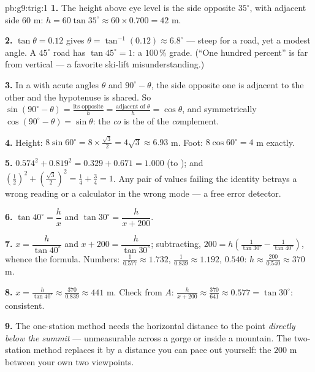\begin{solution}{pb:g9:trig:1}
\textbf{1.} The height above eye level is the side opposite
$35^\circ$, with adjacent side $60$ m:
$h = 60 \tan 35^\circ \approx 60 \times 0.700 = 42$ m.

\textbf{2.} $\tan\theta = 0.12$ gives
$\theta = \tan^{-1}(0.12) \approx 6.8^\circ$ --- steep for a
road, yet a modest angle. A $45^\circ$ road has
$\tan 45^\circ = 1$: a $100\,\%$ grade. (``One hundred
percent'' is far from vertical --- a favorite ski-lift
misunderstanding.)

\textbf{3.} In a  with acute angles $\theta$ and
$90^\circ - \theta$, the side opposite one is adjacent to the
other and the hypotenuse is shared. So
$\sin(90^\circ - \theta) = \frac{\text{its opposite}}{h} =
\frac{\text{adjacent of }\theta}{h} = \cos\theta$, and
symmetrically $\cos(90^\circ - \theta) = \sin\theta$: the
\emph{co} is the  of the \emph{co}mplement.

\textbf{4.} Height: $8 \sin 60^\circ = 8 \times
\frac{\sqrt3}{2} = 4\sqrt3 \approx 6.93$ m. Foot:
$8 \cos 60^\circ = 4$ m exactly.

\textbf{5.} $0.574^2 + 0.819^2 = 0.329 + 0.671 = 1.000$ (to
); and $\left(\frac12\right)^2 +
\left(\frac{\sqrt3}{2}\right)^2 = \frac14 + \frac34 = 1$. Any
pair of values failing the identity betrays a wrong reading or
a calculator in the wrong mode --- a free error detector.

\textbf{6.} $\tan 40^\circ = \dfrac hx$ and
$\tan 30^\circ = \dfrac{h}{x + 200}$.

\textbf{7.} $x = \dfrac{h}{\tan 40^\circ}$ and
$x + 200 = \dfrac{h}{\tan 30^\circ}$; subtracting,
$200 = h\left(\frac{1}{\tan 30^\circ} -
\frac{1}{\tan 40^\circ}\right)$, whence the formula. Numbers:
$\frac{1}{0.577} \approx 1.732$, $\frac{1}{0.839} \approx
1.192$,  $0.540$:
$h \approx \frac{200}{0.540} \approx 370$ m.

\textbf{8.} $x = \frac{h}{\tan 40^\circ} \approx
\frac{370}{0.839} \approx 441$ m. Check from $A$:
$\frac{h}{x + 200} \approx \frac{370}{641} \approx 0.577 =
\tan 30^\circ$: consistent.

\textbf{9.} The one-station method needs the horizontal
distance to the point \emph{directly below the summit} ---
unmeasurable across a gorge or inside a mountain. The
two-station method replaces it by a distance you can pace out
yourself: the $200$ m between your own two viewpoints.


\end{solution}
